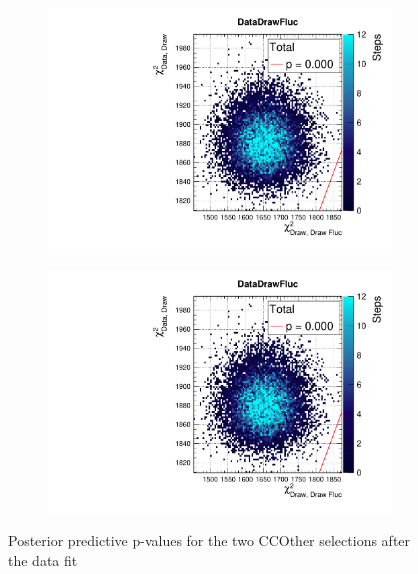 \begin{figure}[h]
	\begin{subfigure}[t]{0.49\textwidth}
		\includegraphics[width=\textwidth, trim={0mm 6mm 0mm 11mm}, clip,page=16]{figures/mach3/data/postpred/2017b_NewData_NewDet_UpdXsecStep_2Xsec_4Det_5Flux_0_PostPred_procs}
	\end{subfigure}
\begin{subfigure}[t]{0.49\textwidth}
	\includegraphics[width=\textwidth, trim={0mm 6mm 0mm 11mm}, clip,page=52]{figures/mach3/data/postpred/2017b_NewData_NewDet_UpdXsecStep_2Xsec_4Det_5Flux_0_PostPred_procs}
\end{subfigure}
	\caption{Posterior predictive p-values for the two CCOther selections after the data fit}
	\label{fig:posterior_pred_data_fgd1ccother}
\end{figure}

